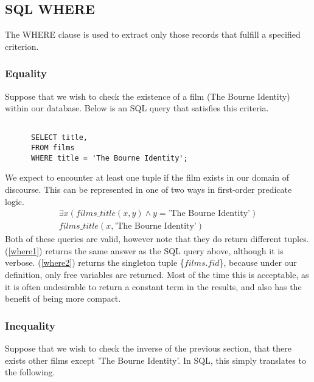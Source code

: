 \documentclass[a4paper, 11pt]{article}
\begin{document}
  \subsection{SQL WHERE}

    The WHERE clause is used to extract only those records that fulfill a
    specified criterion.~\cite{w3WHERE} 

    \subsubsection{Equality}

      Suppose that we wish to check the existence of a film (The Bourne
      Identity) within our database. Below is an SQL query that satisfies this
      criteria.

      \begin{verbatim}

      SELECT title,
      FROM films
      WHERE title = 'The Bourne Identity';

      \end{verbatim}

      We expect to encounter at least one tuple if the film exists in our domain
      of discourse.  This can be represented
      in one of two ways in first-order predicate logic.
      \begin{gather}
        \exists x(films\_title(x, y) \land y = \text{'The Bourne
        Identity'})\label{where1}\\
        films\_title(x, \text{'The Bourne Identity'})\label{where2}
      \end{gather}
      Both of these queries are valid, however note that they do return different
      tuples. (\ref{where1}) returns the same answer as the SQL query above, although
      it is verbose. (\ref{where2}) returns the singleton tuple \{$films.fid$\},
      because under our definition, only free variables are returned. Most of
      the time this is acceptable, as it is often undesirable to return a
      constant term in the results, and also has the benefit of being more
      compact.

    \subsubsection{Inequality}

      Suppose that we wish to check the inverse of the previous section, that
      there exists other films except 'The Bourne Identity'. In SQL, this
      simply translates to the following.
\end{document}
